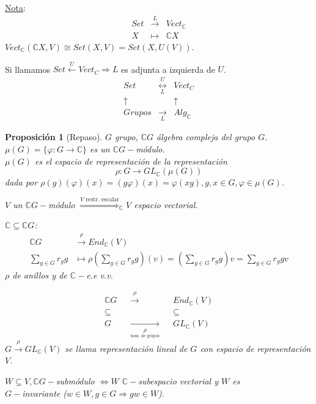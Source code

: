 \documentclass[11pt,a4paper]{article}
\theoremstyle{break}
\newtheorem{proposition}[theorem]{Proposición}
\begin{document}
\underline{Nota}:
$$\begin{aligned}
Set & \overset{L}{\to} & Vect_{\mathbb{C}} \\
X & \mapsto & \mathbb{C}X
\end{aligned}$$
$Vect_{\mathbb{C}}(\mathbb{C}X, V) \cong Set(X, V) = Set(X, U(V))$.

Si llamamos $Set \overset{U}{\gets} Vect_{C} \Rightarrow L$ es adjunta a izquierda de $U$.
$$\begin{aligned}
Set & \overset{U}{\underset{L}{\longleftrightarrow}} & Vect_{C} \\
\uparrow & & \uparrow \\
Grupos & \underset{L}{\longrightarrow} & Alg_{\mathbb{C}}
\end{aligned}$$


\begin{proposition}[Repaso]
$G$ grupo, $\mathbb{C}G$ álgebra compleja del grupo $G$. \\
$\mu(G) = \{\varphi: G \to \mathbb{C}\}$ es un $\mathbb{C}G-$módulo. \\
$\mu(G)$ es el espacio de representación de la representación 
$$\rho: G \to GL_{\mathbb{C}}(\mu(G))$$
dada por $\rho(g)(\varphi)(x) = (g\varphi)(x) = \varphi(xg), g, x \in G, \varphi \in \mu(G)$.

$V$ un $\mathbb{C}G-$módulo $\overset{V \text{ restr. escalar}}{\Rightarrow} _{\mathbb{C}}V$ espacio vectorial.

$\mathbb{C} \subseteq \mathbb{C}G$:
$$\begin{aligned}
\mathbb{C}G & \overset{\rho}{\to} End_{\mathbb{C}}(V) \\
\sum_{g \in G}r_{g}g & \mapsto \rho(\sum_{g \in G}r_{g}g)(v) = (\sum_{g \in G}r_{g}g)v = \sum_{g \in G} r_{g}gv
\end{aligned}$$
$\rho$ de anillos y de $\mathbb{C}-$e.e v.v.

$$\begin{aligned}
\mathbb{C}G & & \overset{\rho}{\to} & & End_{\mathbb{C}}(V) \\
\subseteq & & & & \subseteq \\
G & & \underset{\underset{\text{hom. de grupos}}{\rho}}{\to} & & GL_{\mathbb{C}}(V)
\end{aligned}$$
$G \overset{\rho}{\to} GL_{\mathbb{C}}(V)$ se llama representación lineal de $G$ con espacio de representación $V$.

$W \subseteq V, \mathbb{C}G-$submódulo $\iff W$ $\mathbb{C}-$subespacio vectorial y $W$ es \\ $G-$invariante ($w \in W, g \in G \Rightarrow gw \in W$).
\end{proposition}
\end{document}
